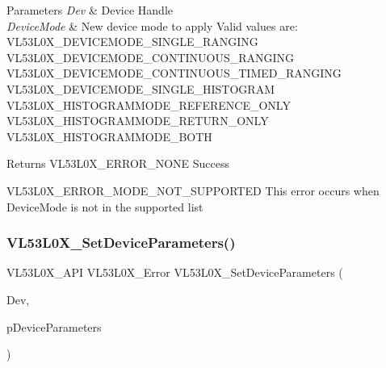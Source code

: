 \begin{DoxyParams}{Parameters}
{\em Dev} & Device Handle \\
\hline
{\em Device\+Mode} & New device mode to apply Valid values are\+: V\+L53\+L0\+X\+\_\+\+D\+E\+V\+I\+C\+E\+M\+O\+D\+E\+\_\+\+S\+I\+N\+G\+L\+E\+\_\+\+R\+A\+N\+G\+I\+NG V\+L53\+L0\+X\+\_\+\+D\+E\+V\+I\+C\+E\+M\+O\+D\+E\+\_\+\+C\+O\+N\+T\+I\+N\+U\+O\+U\+S\+\_\+\+R\+A\+N\+G\+I\+NG V\+L53\+L0\+X\+\_\+\+D\+E\+V\+I\+C\+E\+M\+O\+D\+E\+\_\+\+C\+O\+N\+T\+I\+N\+U\+O\+U\+S\+\_\+\+T\+I\+M\+E\+D\+\_\+\+R\+A\+N\+G\+I\+NG V\+L53\+L0\+X\+\_\+\+D\+E\+V\+I\+C\+E\+M\+O\+D\+E\+\_\+\+S\+I\+N\+G\+L\+E\+\_\+\+H\+I\+S\+T\+O\+G\+R\+AM V\+L53\+L0\+X\+\_\+\+H\+I\+S\+T\+O\+G\+R\+A\+M\+M\+O\+D\+E\+\_\+\+R\+E\+F\+E\+R\+E\+N\+C\+E\+\_\+\+O\+N\+LY V\+L53\+L0\+X\+\_\+\+H\+I\+S\+T\+O\+G\+R\+A\+M\+M\+O\+D\+E\+\_\+\+R\+E\+T\+U\+R\+N\+\_\+\+O\+N\+LY V\+L53\+L0\+X\+\_\+\+H\+I\+S\+T\+O\+G\+R\+A\+M\+M\+O\+D\+E\+\_\+\+B\+O\+TH\\
\hline
\end{DoxyParams}
\begin{DoxyReturn}{Returns}
V\+L53\+L0\+X\+\_\+\+E\+R\+R\+O\+R\+\_\+\+N\+O\+NE Success 

V\+L53\+L0\+X\+\_\+\+E\+R\+R\+O\+R\+\_\+\+M\+O\+D\+E\+\_\+\+N\+O\+T\+\_\+\+S\+U\+P\+P\+O\+R\+T\+ED This error occurs when Device\+Mode is not in the supported list 
\end{DoxyReturn}
\mbox{\label{group__VL53L0X__parameters__group_ga2324960c4e2c54ab5d5788a51e985a86}} 
\subsubsection{\texorpdfstring{V\+L53\+L0\+X\+\_\+\+Set\+Device\+Parameters()}{VL53L0X\_SetDeviceParameters()}}
{\footnotesize\ttfamily V\+L53\+L0\+X\+\_\+\+A\+PI V\+L53\+L0\+X\+\_\+\+Error V\+L53\+L0\+X\+\_\+\+Set\+Device\+Parameters (\begin{DoxyParamCaption}\item[{\hyperlink{group__VL53L0X__platform__group_ga2d6405308b1dd524b462f1b8fb97d167}{V\+L53\+L0\+X\+\_\+\+D\+EV}}]{Dev,  }\item[{const \hyperlink{structVL53L0X__DeviceParameters__t}{V\+L53\+L0\+X\+\_\+\+Device\+Parameters\+\_\+t} $\ast$}]{p\+Device\+Parameters }\end{DoxyParamCaption})}



